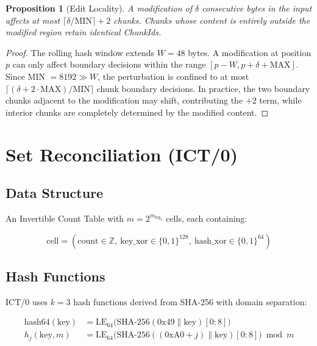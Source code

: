 \documentclass[11pt,twocolumn]{article}
\newtheorem{proposition}[theorem]{Proposition}
\theoremstyle{definition}
\begin{document}
\begin{proposition}[Edit Locality]
\label{prop:locality}
A modification of $\delta$ consecutive bytes in the input affects at most
$\lceil \delta / \text{MIN} \rceil + 2$ chunks. Chunks whose content is
entirely outside the modified region retain identical ChunkIds.
\end{proposition}

\begin{proof}
The rolling hash window extends $W = 48$ bytes. A modification at
position $p$ can only affect boundary decisions within the range
$[p - W, p + \delta + \text{MAX}]$. Since MIN $= 8192 \gg W$, the
perturbation is confined to at most
$\lceil (\delta + 2 \cdot \text{MAX}) / \text{MIN} \rceil$ chunk
boundary decisions. In practice, the two boundary chunks adjacent to the
modification may shift, contributing the $+2$ term, while interior chunks
are completely determined by the modified content.
\end{proof}


\section{Set Reconciliation (ICT/0)}
\label{sec:ict}

\subsection{Data Structure}

An Invertible Count Table with $m = 2^{m_{\log_2}}$ cells, each
containing:

\begin{equation}
  \text{cell} = (\text{count} \in \mathbb{Z},\
                 \text{key\_xor} \in \{0,1\}^{128},\
                 \text{hash\_xor} \in \{0,1\}^{64})
\end{equation}

\subsection{Hash Functions}

ICT/0 uses $k = 3$ hash functions derived from SHA-256 with domain
separation:

\begin{align}
  \text{hash64}(\text{key}) &= \text{LE}_{64}\bigl(
    \text{SHA-256}(0\text{x}49 \| \text{key})[0{:}8]\bigr) \\
  h_j(\text{key}, m) &= \text{LE}_{64}\bigl(
    \text{SHA-256}((0\text{xA0}{+}j) \| \text{key})[0{:}8]\bigr)
    \bmod m
\end{align}
\end{document}
